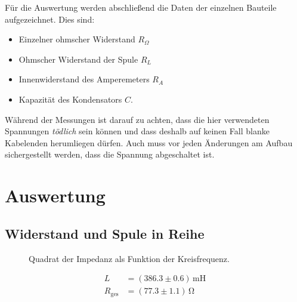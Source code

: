 \documentclass[12pt,a4paper,titlepage,headinclude,bibtotoc]{scrartcl}
\begin{document}
Für die Auswertung werden abschließend die Daten der einzelnen Bauteile aufgezeichnet.
Dies sind:
\begin{itemize}
\item Einzelner ohmscher Widerstand $R_\Omega$
\item Ohmscher Widerstand der Spule $R_L$
\item Innenwiderstand des Amperemeters $R_A$
\item Kapazität des Kondensators $C$.
\end{itemize}

Während der Messungen ist darauf zu achten, dass die hier verwendeten Spannungen \emph{tödlich} sein können und dass deshalb auf keinen Fall blanke Kabelenden herumliegen dürfen.
Auch muss vor jeden Änderungen am Aufbau sichergestellt werden, dass die Spannung abgeschaltet ist.


\section{Auswertung}
\label{sec:auswertung}
\subsection{Widerstand und Spule in Reihe}
\begin{figure}[!htb]
	\centering
	
	\caption{Quadrat der Impedanz als Funktion der Kreisfrequenz.}
	\label{fig:messung1}
\end{figure}

\begin{align}
	L&=(386.3\pm 0.6)\,\si{\milli\henry}\\
	R_\text{ges}&=(77.3 \pm 1.1)\,\si{\ohm}
\end{align}
\end{document}
